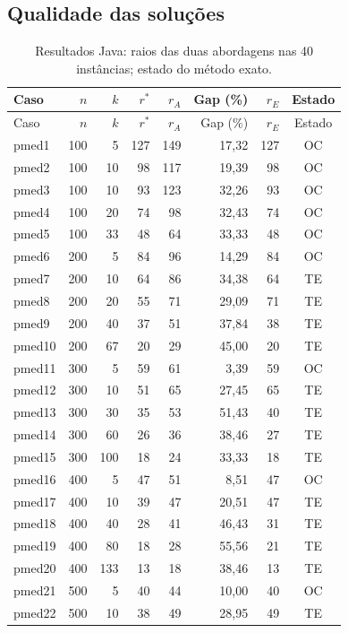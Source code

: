\documentclass[12pt,a4paper]{article}
\begin{document}
\subsection{Qualidade das soluções}
\begin{longtable}{@{}lrrrrrrc@{}}
\caption{Resultados Java: raios das duas abordagens nas 40 instâncias; estado do método exato.}\\
\toprule Caso & $n$ & $k$ & $r^*$ & $r_A$ & Gap (\%) & $r_E$ & Estado\\ \midrule
\endfirsthead
\toprule Caso & $n$ & $k$ & $r^*$ & $r_A$ & Gap (\%) & $r_E$ & Estado\\ \midrule
\endhead
pmed1 & 100 & 5 & 127 & 149 & 17,32 & 127 & OC \\
pmed2 & 100 & 10 & 98 & 117 & 19,39 & 98 & OC \\
pmed3 & 100 & 10 & 93 & 123 & 32,26 & 93 & OC \\
pmed4 & 100 & 20 & 74 & 98 & 32,43 & 74 & OC \\
pmed5 & 100 & 33 & 48 & 64 & 33,33 & 48 & OC \\
pmed6 & 200 & 5 & 84 & 96 & 14,29 & 84 & OC \\
pmed7 & 200 & 10 & 64 & 86 & 34,38 & 64 & TE \\
pmed8 & 200 & 20 & 55 & 71 & 29,09 & 71 & TE \\
pmed9 & 200 & 40 & 37 & 51 & 37,84 & 38 & TE \\
pmed10 & 200 & 67 & 20 & 29 & 45,00 & 20 & TE \\
pmed11 & 300 & 5 & 59 & 61 & 3,39 & 59 & OC \\
pmed12 & 300 & 10 & 51 & 65 & 27,45 & 65 & TE \\
pmed13 & 300 & 30 & 35 & 53 & 51,43 & 40 & TE \\
pmed14 & 300 & 60 & 26 & 36 & 38,46 & 27 & TE \\
pmed15 & 300 & 100 & 18 & 24 & 33,33 & 18 & TE \\
pmed16 & 400 & 5 & 47 & 51 & 8,51 & 47 & OC \\
pmed17 & 400 & 10 & 39 & 47 & 20,51 & 47 & TE \\
pmed18 & 400 & 40 & 28 & 41 & 46,43 & 31 & TE \\
pmed19 & 400 & 80 & 18 & 28 & 55,56 & 21 & TE \\
pmed20 & 400 & 133 & 13 & 18 & 38,46 & 13 & TE \\
pmed21 & 500 & 5 & 40 & 44 & 10,00 & 40 & OC \\
pmed22 & 500 & 10 & 38 & 49 & 28,95 & 49 & TE \\

\end{longtable}
\end{document}
